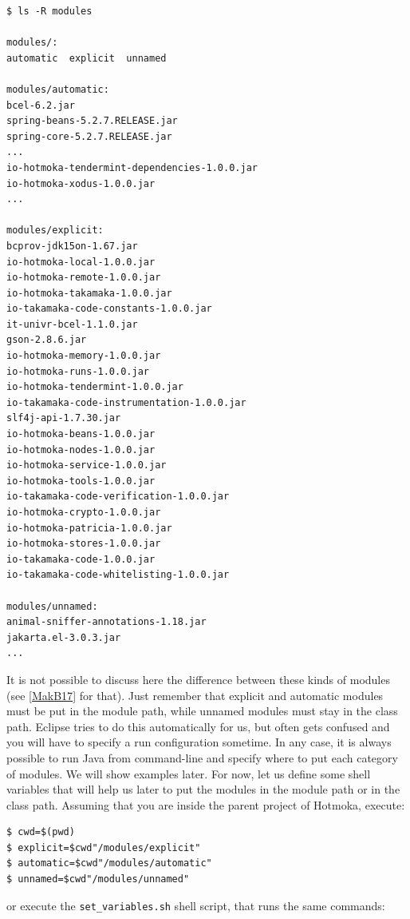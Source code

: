 \documentclass[a4paper,]{book}
\begin{document}
{\begin{myverbatim}
\begin{verbatim}
$ ls -R modules

modules/:
automatic  explicit  unnamed

modules/automatic:
bcel-6.2.jar
spring-beans-5.2.7.RELEASE.jar
spring-core-5.2.7.RELEASE.jar
...
io-hotmoka-tendermint-dependencies-1.0.0.jar
io-hotmoka-xodus-1.0.0.jar
...

modules/explicit:
bcprov-jdk15on-1.67.jar
io-hotmoka-local-1.0.0.jar
io-hotmoka-remote-1.0.0.jar
io-hotmoka-takamaka-1.0.0.jar
io-takamaka-code-constants-1.0.0.jar
it-univr-bcel-1.1.0.jar
gson-2.8.6.jar
io-hotmoka-memory-1.0.0.jar
io-hotmoka-runs-1.0.0.jar
io-hotmoka-tendermint-1.0.0.jar
io-takamaka-code-instrumentation-1.0.0.jar
slf4j-api-1.7.30.jar
io-hotmoka-beans-1.0.0.jar
io-hotmoka-nodes-1.0.0.jar
io-hotmoka-service-1.0.0.jar
io-hotmoka-tools-1.0.0.jar
io-takamaka-code-verification-1.0.0.jar
io-hotmoka-crypto-1.0.0.jar
io-hotmoka-patricia-1.0.0.jar
io-hotmoka-stores-1.0.0.jar
io-takamaka-code-1.0.0.jar
io-takamaka-code-whitelisting-1.0.0.jar

modules/unnamed:
animal-sniffer-annotations-1.18.jar
jakarta.el-3.0.3.jar
...
\end{verbatim}
\end{myverbatim}

It is not possible to discuss here the difference between these kinds of
modules (see \protect\hyperlink{MakB17}{{[}MakB17{]}} for that). Just
remember that explicit and automatic modules must be put in the module
path, while unnamed modules must stay in the class path. Eclipse tries
to do this automatically for us, but often gets confused and you will
have to specify a run configuration sometime. In any case, it is always
possible to run Java from command-line and specify where to put each
category of modules. We will show examples later. For now, let us define
some shell variables that will help us later to put the modules in the
module path or in the class path. Assuming that you are inside the
parent project of Hotmoka, execute:

\begin{myverbatim}
\begin{verbatim}
$ cwd=$(pwd)
$ explicit=$cwd"/modules/explicit"
$ automatic=$cwd"/modules/automatic"
$ unnamed=$cwd"/modules/unnamed"
\end{verbatim}
\end{myverbatim}

or execute the \texttt{set\_variables.sh} shell script, that runs the
same commands:

}
\end{document}
